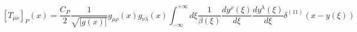 \begin{equation}
\left[T_{\mu\nu}\right]_P(x)
=\frac{C_P}{2}\frac{1}{\sqrt{|g(x)|}}g_{\mu\rho}(x)g_{\nu\lambda}(x)
\int_{-\infty}^{+\infty} d\xi
\frac{1}{\beta(\xi)}\frac{dy^\rho(\xi)}{d\xi}
\frac{dy^\lambda(\xi)}{d\xi}  \delta^{(11)}(x-y(\xi))
\end{equation}

